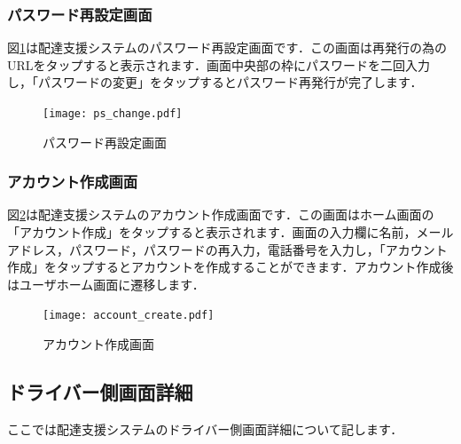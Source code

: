 \documentclass[a4j,titlepage]{jarticle}
\begin{document}
\subsubsection{パスワード再設定画面}
図\ref{fig:ps_change}は配達支援システムのパスワード再設定画面です．この画面は再発行の為のURLをタップすると表示されます．画面中央部の枠にパスワードを二回入力し，「パスワードの変更」をタップするとパスワード再発行が完了します．

\begin{figure}[htbp]
 \begin{center}
  \texttt{[image: ps\_change.pdf]}
	\caption{パスワード再設定画面}
	\label{fig:ps_change}
 \end{center}

\end{figure}

\subsubsection{アカウント作成画面}
図\ref{fig:account_create}は配達支援システムのアカウント作成画面です．この画面はホーム画面の「アカウント作成」をタップすると表示されます．画面の入力欄に名前，メールアドレス，パスワード，パスワードの再入力，電話番号を入力し，「アカウント作成」をタップするとアカウントを作成することができます．アカウント作成後はユーザホーム画面に遷移します．

\begin{figure}[htbp]
 \begin{center}
  \texttt{[image: account\_create.pdf]}
	\caption{アカウント作成画面}
	\label{fig:account_create}
 \end{center}

\end{figure}

\subsection{ドライバー側画面詳細}
ここでは配達支援システムのドライバー側画面詳細について記します．
\end{document}

